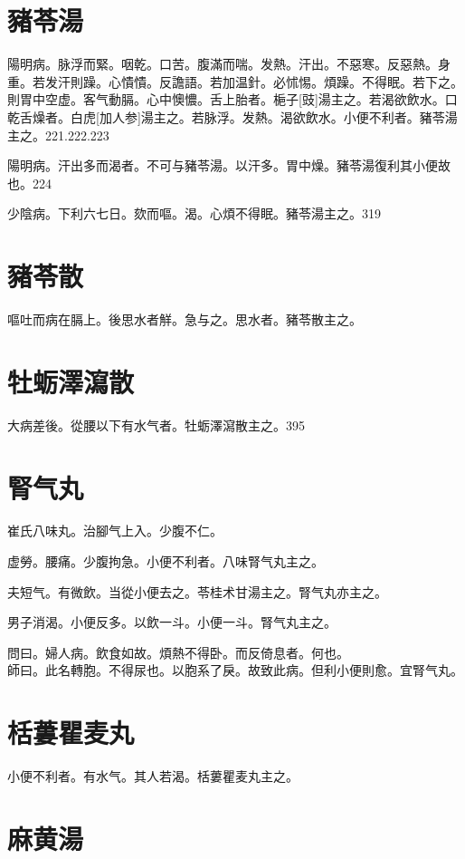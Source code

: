 \documentclass[12pt,oneside,UTF8,b5paper]{ctexbook}她她她她她她她
\begin{document}
\section{豬苓湯}

陽明病。脉浮而緊。咽乾。口苦。腹滿而喘。发熱。汗出。不惡寒。反惡熱。身重。若发汗則躁。心憒憒。反譫語。若加温針。必怵惕。煩躁。不得眠。若下之。則胃中空虚。客气動膈。心中懊憹。舌上胎者。梔子[豉]湯主之。若渴欲飲水。口乾舌燥者。白虎[加人参]湯主之。若脉浮。发熱。渴欲飲水。小便不利者。豬苓湯主之。221.222.223

陽明病。汗出多而渴者。不可与豬苓湯。以汗多。胃中燥。豬苓湯復利其小便故也。224

少陰病。下利六七日。欬而嘔。渴。心煩不得眠。豬苓湯主之。319

\section{豬苓散}

嘔吐而病在膈上。後思水者觧。急与之。思水者。豬苓散主之。

\section{牡蛎澤瀉散}

大病差後。從腰以下有水气者。牡蛎澤瀉散主之。395

\section{腎气丸}

崔氏八味丸。治腳气上入。少腹不仁。

虚勞。腰痛。少腹拘急。小便不利者。八味腎气丸主之。

夫短气。有微飲。当從小便去之。苓桂术甘湯主之。腎气丸亦主之。

男子消渴。小便反多。以飲一斗。小便一斗。腎气丸主之。

問曰。婦人病。飲食如故。煩熱不得卧。而反倚息者。何也。\\
師曰。此名轉胞。不得尿也。以胞系了戾。故致此病。但利小便則愈。宜腎气丸。

\section{栝蔞瞿麦丸}

小便不利者。有水气。其人若渴。栝蔞瞿麦丸主之。

\section{麻黄湯}
\end{document}

